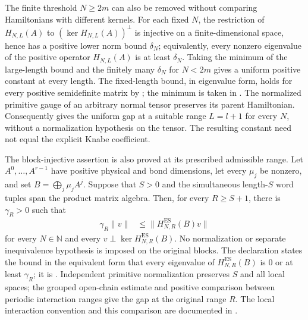 \documentclass{article}
\begin{document}
The finite threshold $N\geq2m$ can also be removed without comparing
Hamiltonians with different kernels. For each fixed $N$, the restriction of
$H_{N,L}(A)$ to $(\ker H_{N,L}(A))^\perp$ is injective on a finite-dimensional
space, hence has a positive lower norm bound $\delta_N$; equivalently, every
nonzero eigenvalue of the positive operator $H_{N,L}(A)$ is at least
$\delta_N$. Taking the minimum
of the large-length bound and the finitely many $\delta_N$ for $N<2m$
gives a uniform positive constant at every length. The fixed-length bound,
in eigenvalue form, holds for every positive semidefinite matrix by
; the minimum is taken in
.
The normalized primitive gauge of an arbitrary normal tensor preserves its
parent Hamiltonian. Consequently
gives the uniform gap at a suitable range $L=l+1$ for every $N$,
without a normalization hypothesis on the tensor. The resulting constant
need not equal the explicit Knabe coefficient.

The block-injective assertion is also proved at its prescribed admissible
range. Let $A^0,\ldots,A^{r-1}$ have positive physical and bond dimensions,
let every $\mu_j$ be nonzero, and set $B=\bigoplus_j\mu_j A^j$. Suppose that
$S>0$ and the simultaneous length-$S$ word tuples span the product matrix
algebra. Then, for every $R\geq S+1$, there is $\gamma_R>0$ such that
\begin{align}
    \gamma_R\lVert v\rVert
      &\leq\lVert H_{N,R}^{\mathrm{ES}}(B)v\rVert
    \label{eq:cpgsv21_martingale_overlap_block_prescribed_gap}
\end{align}
for every $N\in\mathbb N$ and every
$v\perp\ker H_{N,R}^{\mathrm{ES}}(B)$. No normalization or separate
inequivalence hypothesis is imposed on the original blocks. The declaration
states the bound in the equivalent form that every eigenvalue of
$H_{N,R}^{\mathrm{ES}}(B)$ is $0$ or at least $\gamma_R$; it is
.
Independent primitive normalization preserves $S$ and all local spaces;
the grouped open-chain estimate and positive comparison between periodic
interaction ranges give the gap at the original range $R$. The local
interaction convention and this comparison are documented in
.
\end{document}

